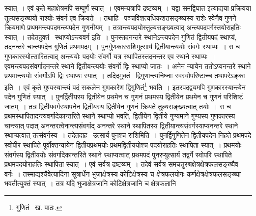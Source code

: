\documentclass[11pt, openany]{book}
\begin{document}
\noindent स्यात्~। एवं कृते महाक्षेत्रमपि सम्पूर्णं स्यात्~। एवमन्यत्रापि द्रष्टव्यम्~। यद्वा समद्विघात इत्याद्यया प्रक्रियया तुल्यसङ्ख्ययो राश्योः संवर्ग एव क्रियते~। तथाहि \textendash\ पञ्चविंशत्यधिकशतसङ्ख्यस्य राशेः स्वेनैव गुणने क्रियमाणे प्रथममन्त्यपदमन्त्यपदेन गुणनीयम्~। तत्रान्त्यपदयोस्तुल्यसङ्ख्यत्वाद् अन्त्यपदवर्गस्तयोराहतिः स्यात्~। तदेतदुक्तं \textendash\ {\qt स्थाप्योऽन्त्यवर्ग} इति~। पुनस्तदनन्तरे स्थानेऽन्त्यपदेन गुणितं द्वितीयपदं स्थाप्यं, तदनन्तरे चान्त्यपदेन गुणितं प्रथमपदम्~। पुनर्गुणकारराशिमुत्सार्य द्वितीयान्त्ययोः संवर्गः स्थाप्यः~। स च गुणकारस्योत्सारितत्वाद् अन्त्ययोः पदयोः संवर्गो यत्र स्थापितस्तदनन्तर एव स्थाने स्थाप्यः~। एवमन्त्यपदसंवर्गादनन्तरे स्थाने द्वितीयन्त्ययोः संवर्गो द्विः स्थाप्यो जातः~। अनेन न्यायेन ततोऽप्यनन्तरे स्थाने प्रथमान्त्ययोः संवर्गोऽपि द्विः स्थाप्यः स्यात्~। तदिदमुक्तं \textendash\ {\qt द्विगुणान्त्यनिघ्नाः स्वस्वोपरिष्टाच्च तथापरेऽङ्का} इति~। एवं कृते गुण्यस्यान्त्यं पदं सकलेन गुणकारेण द्विगुणितं\renewcommand{\thefootnote}{१}\footnote{गुणितं \textendash\ ख. पाठः.} भवति~। इतरपदद्वयमपि
गुणकारस्यान्त्येन पदेन गुणितं स्यात्~। पुनर्द्वितीयस्य द्वितीयेन प्रथमेन च गुणनं प्रथमस्य द्वितीयेन प्रथमेन च गुणनं परिशिष्टं जातम्~। तत्र द्वितीयवर्गस्थापनेन द्वितीयस्य द्वितीयेन गुणनं क्रियते तुल्यसङ्ख्यत्वात् तयोः~। स च प्रथमस्थापितादन्त्यवर्गादेकान्तरिते स्थाने स्थाप्यो भवति, द्वितीयेन द्वितीये गुण्यमाने गुण्यस्य गुणकारस्य चान्त्यात् पदात् अनन्तरत्वेनान्त्यसंवर्गाद् अनन्तरे स्थाने स्थापितस्य द्वितीयान्त्यसंवर्गस्याप्यनन्तरे स्थाने स्थाप्यत्वात् तत्संवर्गस्य~। तदेतदाह \textendash\ {\qt उत्सार्य पुनश्च राशि}मिति~। पुनर्द्विगुणितेन द्वितीयपदेन निहते प्रथमपदे स्वोपीर स्थापिते पूर्वोक्तन्यायेन द्वितीयप्रथमयोः प्रथमद्वितीययोश्च पदयोराहतिः स्थापिता स्यात्~। प्रथमयोः संवर्गस्य द्वितीययोः संवर्गादेकान्तरिते स्थाने स्थाप्यत्वात् प्रथमपदं पुनरप्युत्सार्य तद्वर्गे स्वोपरि स्थापिते प्रथमपदयोराहतिः स्थापिता स्यात्~। एवं सर्वत्र द्रष्टव्यम्~। तदेवं सर्वत्र समचतुरश्रक्षेत्रक्षेत्रफलसङ्ख्यैव वर्गः~। तस्माद्यश्चैवेत्यादिना सूत्रार्धेन भुजाक्षेत्रस्य कोटिक्षेत्रस्य च क्षेत्रफलयोगः कर्णक्षेत्रक्षेत्रफलसङ्ख्या भवतीत्युक्तं स्यात्~। तत्र यदि भुजाक्षेत्रजानि कोटिक्षेत्रजानि च क्षेत्रफलानि

\newpage
\end{document}
